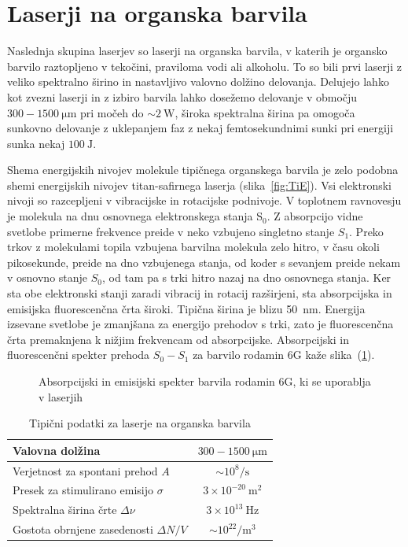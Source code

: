\section{Laserji na organska barvila}
Naslednja skupina laserjev so laserji na organska barvila, v katerih
je organsko barvilo raztopljeno v tekočini, praviloma vodi ali alkoholu. 
To so bili prvi laserji z veliko spektralno širino in nastavljivo valovno dolžino
delovanja. Delujejo lahko kot zvezni laserji in z izbiro barvila lahko dosežemo
delovanje v območju $300-1500~\si{\micro\metre}$ pri močeh do $\sim 2~\si{\watt}$, 
široka spektralna širina pa omogoča sunkovno delovanje z uklepanjem faz 
z nekaj femtosekundnimi sunki pri energiji sunka nekaj $100~\si{\joule}$.

Shema energijskih nivojev molekule tipičnega organskega barvila
je zelo podobna shemi energijskih nivojev titan-safirnega laserja (slika~\ref{fig:TiE}).
Vsi elektronski nivoji so razcepljeni v vibracijske in rotacijske podnivoje. 
V toplotnem ravnovesju je molekula na dnu osnovnega elektronskega stanja S$_0$. 
Z absorpcijo vidne svetlobe primerne frekvence preide v neko vzbujeno
singletno stanje $S_1$. Preko trkov z molekulami topila vzbujena barvilna molekula
zelo hitro, v času okoli pikosekunde, preide na dno vzbujenega stanja, od
koder s sevanjem preide nekam v osnovno stanje $S_0$, od tam pa s trki
hitro nazaj na dno osnovnega stanja. Ker
sta obe elektronski stanji zaradi vibracij in rotacij razširjeni, sta 
absorpcijska in emisijska fluorescenčna črta široki. Tipična
širina je blizu 50~nm. Energija izsevane svetlobe je zmanjšana za energijo
prehodov s trki, zato je fluorescenčna črta premaknjena k nižjim
frekvencam od absorpcijske. Absorpcijski in fluorescenčni spekter prehoda $S_0-S_1$
za barvilo rodamin 6G kaže slika~(\ref{fig:RhG}).

\begin{figure}[h]
\centering
\def\svgwidth{80truemm} 

\caption{Absorpcijski in emisijski spekter barvila rodamin 6G, ki se uporablja v laserjih}
\label{fig:RhG}
\end{figure} 

\begin{table}[h]
\begin{center}
\begin{tabular}{|l|c|}\hline
Valovna dolžina  & $300 - 1500~\si{\micro\meter}$\\ \hline
Verjetnost za spontani prehod $A$ & $ \sim 10^8/\si{\second}$ \\ \hline
Presek za stimulirano emisijo $\sigma$ & $3 \times 10^{-20}~\si{\metre}^2$ \\ \hline
Spektralna širina črte $\Delta \nu$ & $3 \times 10^{13}~\si{\hertz}$  \\ \hline
Gostota obrnjene zasedenosti $\Delta N/V$ & $ \sim 10^{22}/\si{\metre}^3$ \\ \hline
\end{tabular}
\caption{Tipični podatki za laserje na organska barvila}
\label{tab:orgb}
\end{center}
\end{table}


